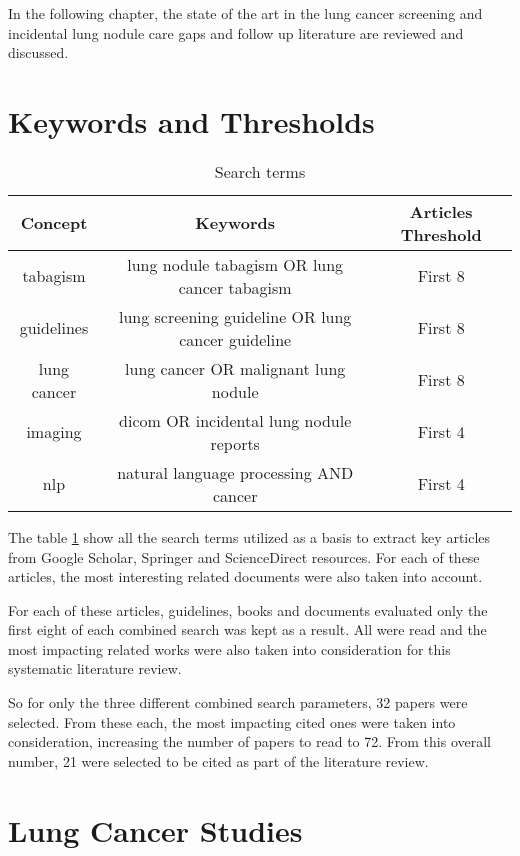 \label{chap:literature_review}

In the following chapter, the state of the art in the lung cancer screening and incidental lung nodule care gaps and follow up literature are reviewed and discussed.

\section{Keywords and Thresholds}
\begin{center}
\begin{table}

  \begin{tabular}{c|c|c}
    \hline 
    Concept & Keywords & Articles Threshold\tabularnewline
    \hline 
    tabagism & lung nodule tabagism OR lung cancer tabagism & First 8\tabularnewline
    guidelines & lung screening guideline OR lung cancer guideline & First 8\tabularnewline
    lung cancer & lung cancer OR malignant lung nodule & First 8\tabularnewline
    imaging & dicom OR incidental lung nodule reports & First 4\tabularnewline
    nlp & natural language processing AND cancer & First 4\tabularnewline
    \hline 
  \end{tabular}
\par
\caption{\label{table:search_terms} Search terms}
\end{table}
  \vspace*{-44pt}
\end{center}

The table \ref{table:search_terms} show all the search terms utilized as a basis to extract key articles from Google Scholar, Springer  and ScienceDirect resources. For each of these articles, the most interesting related documents were also taken into account.

For each of these articles, guidelines, books and documents evaluated only the first eight of each combined search was kept as a result. All were read and the most impacting related works were also taken into consideration for this systematic literature review.

So for only the three different combined search parameters, 32 papers were selected. From these each, the  most impacting cited ones were taken into consideration, increasing the number of papers to  read to 72. From this overall number, 21 were selected to be cited as part of the literature review. %

\section{Lung Cancer Studies}

